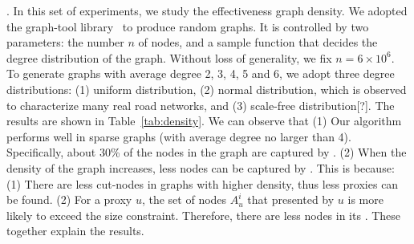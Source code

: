 .
In this set of experiments, we study the effectiveness \wrt graph density. We adopted the graph-tool library~\cite{peixoto_graph-tool_2014} to produce random graphs. It is controlled by two parameters: the number $n$ of nodes, and a sample function that decides the degree distribution of the graph. Without loss of generality, we fix $n=6\times 10^6$. To generate graphs with average degree 2, 3, 4, 5 and 6, we adopt three degree distributions: (1) uniform distribution, (2) normal distribution, which is observed to characterize many real road networks\cite{progulova2008modeling}, and (3) scale-free distribution[?]. The results are shown in Table~\ref{tab:density}. We can observe that (1) Our algorithm performs well in sparse graphs (with average degree no larger than 4). Specifically, about 30\% of the nodes in the graph are captured by \dras. (2) When the density of the graph increases, less nodes can be captured by \dras. This is because: (1) There are less cut-nodes in graphs with higher density, thus less proxies can be found. (2) For a proxy $u$, the set of nodes $A_u^i$ that presented by $u$ is more likely to exceed the size constraint. Therefore, there are less nodes in its \dra. These together explain the results.


